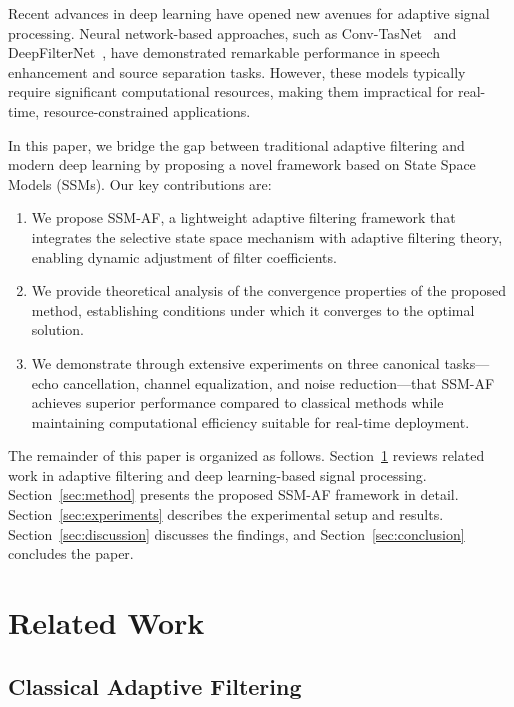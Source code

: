 \documentclass[a4paper,fleqn]{cas-sc}
\begin{document}
Recent advances in deep learning have opened new avenues for adaptive signal processing. Neural network-based approaches, such as Conv-TasNet~\citep{luo2019conv} and DeepFilterNet~\citep{schroeter2022deepfilternet}, have demonstrated remarkable performance in speech enhancement and source separation tasks. However, these models typically require significant computational resources, making them impractical for real-time, resource-constrained applications.

In this paper, we bridge the gap between traditional adaptive filtering and modern deep learning by proposing a novel framework based on State Space Models (SSMs). Our key contributions are:

\begin{enumerate}
\item We propose SSM-AF, a lightweight adaptive filtering framework that integrates the selective state space mechanism with adaptive filtering theory, enabling dynamic adjustment of filter coefficients.
\item We provide theoretical analysis of the convergence properties of the proposed method, establishing conditions under which it converges to the optimal solution.
\item We demonstrate through extensive experiments on three canonical tasks---echo cancellation, channel equalization, and noise reduction---that SSM-AF achieves superior performance compared to classical methods while maintaining computational efficiency suitable for real-time deployment.
\end{enumerate}

The remainder of this paper is organized as follows. Section~\ref{sec:related} reviews related work in adaptive filtering and deep learning-based signal processing. Section~\ref{sec:method} presents the proposed SSM-AF framework in detail. Section~\ref{sec:experiments} describes the experimental setup and results. Section~\ref{sec:discussion} discusses the findings, and Section~\ref{sec:conclusion} concludes the paper.


\section{Related Work}\label{sec:related}

\subsection{Classical Adaptive Filtering}
\end{document}
